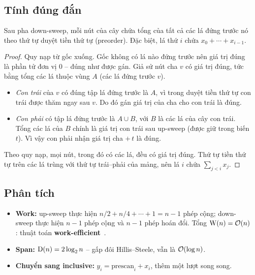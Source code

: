 \subsection{Tính đúng đắn}

\begin{theorem}
Sau pha down-sweep, mỗi nút của cây chứa tổng của tất cả các lá đứng trước nó theo thứ tự duyệt
tiền thứ tự (preorder). Đặc biệt, lá thứ \(i\) chứa \(x_0 + \cdots + x_{i-1}\).
\end{theorem}

\begin{proof}
Quy nạp từ gốc xuống. Gốc không có lá nào đứng trước nên giá trị đúng là phần tử đơn vị 0 --
đúng như được gán. Giả sử nút cha \(v\) có giá trị đúng, tức bằng tổng các lá thuộc vùng \(A\)
(các lá đứng trước \(v\)).
\begin{itemize}
  \item \emph{Con trái} của \(v\) có đúng tập lá đứng trước là \(A\), vì trong duyệt tiền thứ tự
        con trái được thăm ngay sau \(v\). Do đó gán giá trị của cha cho con trái là đúng.
  \item \emph{Con phải} có tập lá đứng trước là \(A \cup B\), với \(B\) là các lá của cây con trái.
        Tổng các lá của \(B\) chính là giá trị con trái sau up-sweep (được giữ trong biến
        \(t\)). Vì vậy con phải nhận giá trị cha \(+\, t\) là đúng.
\end{itemize}
Theo quy nạp, mọi nút, trong đó có các lá, đều có giá trị đúng. Thứ tự tiền thứ tự trên các lá
trùng với thứ tự trái--phải của mảng, nên lá \(i\) chứa \(\sum_{j<i} x_j\).
\end{proof}

\subsection{Phân tích}

\begin{itemize}
  \item \textbf{Work:} up-sweep thực hiện \(n/2 + n/4 + \cdots + 1 = n - 1\) phép cộng; down-sweep
        thực hiện \(n - 1\) phép cộng và \(n - 1\) phép hoán đổi. Tổng \(\mathrm{W}(n) = \mathcal{O}(n)\): thuật
        toán \textbf{work-efficient}~\cite{harris2007}.
  \item \textbf{Span:} \(\mathrm{D}(n) = 2\log_2 n\) -- gấp đôi Hillis--Steele, vẫn là \(\mathcal{O}(\log n)\).
  \item \textbf{Chuyển sang inclusive:} \(y_i = \text{prescan}_i + x_i\), thêm một lượt song song.
\end{itemize}

